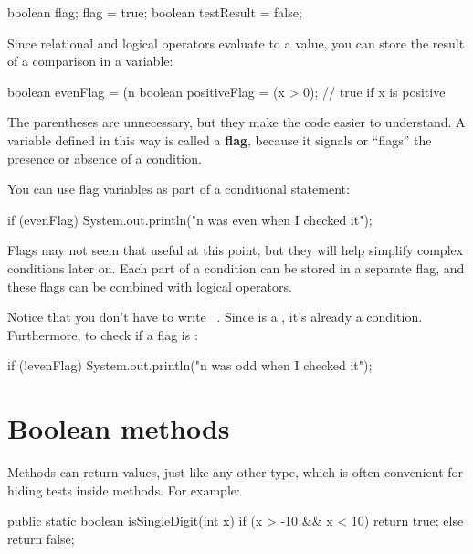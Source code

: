 \begin{code}
boolean flag;
flag = true;
boolean testResult = false;
\end{code}


Since relational and logical operators evaluate to a  value, you can store the result of a comparison in a variable:

\begin{code}
boolean evenFlag = (n %
boolean positiveFlag = (x > 0);     // true if x is positive
\end{code}


The parentheses are unnecessary, but they make the code easier to understand.
A variable defined in this way is called a {\bf flag}, because it signals or ``flags'' the presence or absence of a condition.

You can use flag variables as part of a conditional statement:

\begin{code}
if (evenFlag) {
    System.out.println("n was even when I checked it");
}
\end{code}

Flags may not seem that useful at this point, but they will help simplify complex conditions later on.
Each part of a condition can be stored in a separate flag, and these flags can be combined with logical operators.

Notice that you don't have to write ~.
Since  is a , it's already a condition.
Furthermore, to check if a flag is :

\begin{code}
if (!evenFlag) {
    System.out.println("n was odd when I checked it");
}
\end{code}


\section{Boolean methods}
\label{boolmeth}


Methods can return  values, just like any other type, which is often convenient for hiding tests inside methods.
For example:

\begin{code}
public static boolean isSingleDigit(int x) {
    if (x > -10 && x < 10) {
        return true;
    } else {
        return false;
    }
}
\end{code}

